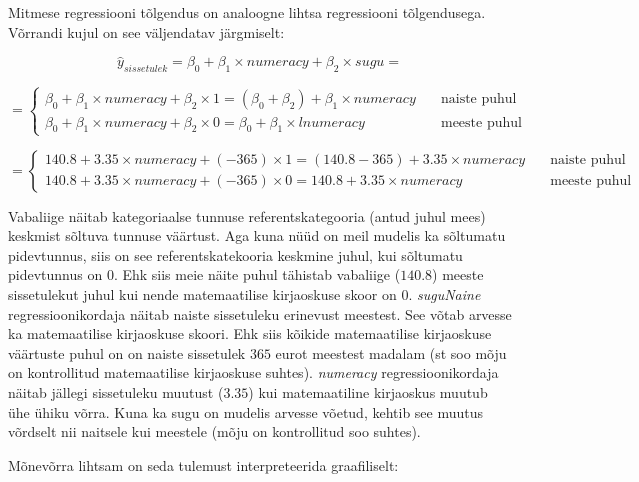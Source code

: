 \documentclass[
]{book}
\begin{document}
Mitmese regressiooni tõlgendus on analoogne lihtsa regressiooni tõlgendusega. Võrrandi kujul on see väljendatav järgmiselt:

\[\hat{y}_{sissetulek}=\beta_0+\beta_1 \times numeracy + \beta_2 \times sugu  =\]

\[ =
  \begin{cases}
    \beta_0+\beta_1 \times numeracy + \beta_2 \times 1 = (\beta_0+\beta_2)+\beta_1 \times numeracy  & \quad \text{naiste puhul}\\
    \beta_0+\beta_1 \times numeracy + \beta_2 \times 0 = \beta_0+\beta_1 \times lnumeracy & \quad \text{meeste puhul}
  \end{cases}
\]

\[ =
  \begin{cases}
    140.8+3.35 \times numeracy + (-365) \times 1 = (140.8-365)+3.35 \times numeracy  & \quad \text{naiste puhul}\\
    140.8+3.35 \times numeracy + (-365) \times 0 = 140.8+3.35 \times numeracy & \quad \text{meeste puhul}
  \end{cases}
\]

Vabaliige näitab kategoriaalse tunnuse referentskategooria (antud juhul mees) keskmist sõltuva tunnuse väärtust. Aga kuna nüüd on meil mudelis ka sõltumatu pidevtunnus, siis on see referentskatekooria keskmine juhul, kui sõltumatu pidevtunnus on \(0\). Ehk siis meie näite puhul tähistab vabaliige (\(140.8\)) meeste sissetulekut juhul kui nende matemaatilise kirjaoskuse skoor on \(0\). \emph{suguNaine} regressioonikordaja näitab naiste sissetuleku erinevust meestest. See võtab arvesse ka matemaatilise kirjaoskuse skoori. Ehk siis kõikide matemaatilise kirjaoskuse väärtuste puhul on on naiste sissetulek \(365\) eurot meestest madalam (st soo mõju on kontrollitud matemaatilise kirjaoskuse suhtes). \emph{numeracy} regressioonikordaja näitab jällegi sissetuleku muutust (\(3.35\)) kui matemaatiline kirjaoskus muutub ühe ühiku võrra. Kuna ka sugu on mudelis arvesse võetud, kehtib see muutus võrdselt nii naitsele kui meestele (mõju on kontrollitud soo suhtes).

Mõnevõrra lihtsam on seda tulemust interpreteerida graafiliselt:
\end{document}

